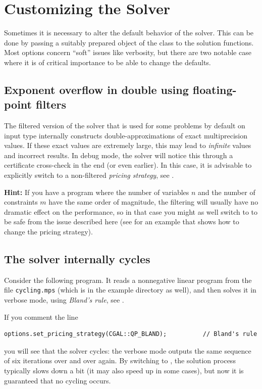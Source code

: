 \section{Customizing the Solver\label{sec:QP-customization}}
Sometimes it is necessary to alter the default behavior of the solver.
This can be done by passing a suitably prepared object of the class
 to the solution functions. Most options 
concern ``soft'' issues like verbosity, but there are two notable case 
where it is of critical importance to be able to change the defaults.

\subsection{Exponent overflow in double using floating-point filters\label{sec:QP-customization-filtering}}
The filtered version of the solver that is used for some problems
by default on input
type  internally constructs double-approximations of exact
multiprecision values. If these exact values are extremely large, this
may lead to \emph{infinite}  values and incorrect results.
In debug mode, the solver will notice this through a certificate 
cross-check in the end (or even earlier). In this case, it is advisable
to explicitly switch to a non-filtered \emph{pricing strategy}, see
.

{\bf Hint:} 
If you have a program where the number of variables $n$ and the number of
constraints $m$ have the same order of 
magnitude, the filtering will usually have
no dramatic effect on the performance, so in that case you might as well 
switch to  
to be safe from the issue described here (see 
for an example that shows how to change the pricing strategy).

\subsection{The solver internally cycles\label{sec:QP-customization-cycling}}
Consider the following program. It reads a nonnegative linear program from 
the file \texttt{cycling.mps} (which is in the example directory as well),
and then solves it in verbose mode, using \emph{Bland's rule}, see
.


If you comment the line 
\begin{verbatim}
options.set_pricing_strategy(CGAL::QP_BLAND);          // Bland's rule
\end{verbatim}
you will see that the solver cycles: the verbose mode outputs the same
sequence of six iterations over and over again. By switching to 
, the solution process typically slows down a bit 
(it may also speed up in some cases), but now it is guaranteed that
no cycling occurs.

